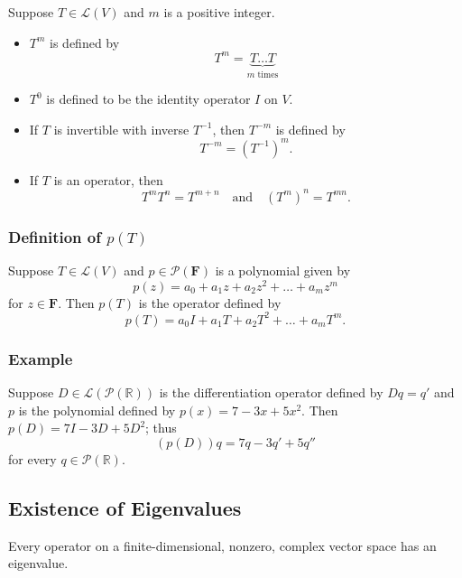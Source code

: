 \documentclass[11pt]{article}
\begin{document}
    Suppose \(T \in \mathcal{L}(V)\) and $m$ is a positive integer.
    \begin{itemize}
        \item \(T^m\) is defined by 
        \begin{equation*}
            T^m = \underbrace{T \dots T}_{m \text{ times}}
        \end{equation*}
        \item \(T^0\) is defined to be the identity operator $I$ on $V$.
        \item If $T$ is invertible with inverse \(T^{-1}\), then \(T^{-m}\) is defined by \[T^{-m} = (T^{-1})^m.\]
        \item If $T$ is an operator, then \[T^m T^n = T^{m+n} \quad \text{and} \quad (T^m)^n = T^{mn}.\]
    \end{itemize}

    \subsubsection{Definition of \(p(T)\)}

    Suppose \(T \in \mathcal{L}(V)\) and \(p \in \mathcal{P}(\textbf{F})\) is a polynomial given by \[p(z) = a_0 + a_1 z + a_2 z^2 + \dots + a_m z^m\] for \(z \in \textbf{F}\). Then \(p(T)\) is the operator defined by \[p(T) = a_0 I + a_1 T + a_2 T^2 + \dots + a_m T^m.\]

    \subsubsection{Example}

    Suppose \(D \in \mathcal{L}(\mathcal{P}(\mathbb{R}))\) is the differentiation operator defined by \(Dq = q'\) and $p$ is the polynomial defined by \(p(x) = 7 - 3x + 5x^2\). Then \(p(D) = 7I - 3D + 5D^2\); thus \[(p(D))q = 7q - 3q' + 5q''\] for every \(q \in \mathcal{P}(\mathbb{R})\).

    \subsection{Existence of Eigenvalues}

    Every operator on a finite-dimensional, nonzero, complex vector space has an eigenvalue. 
\end{document}
